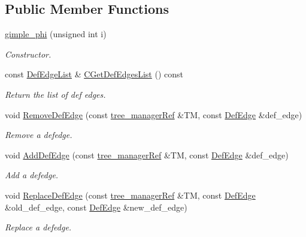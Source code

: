 \subsection*{Public Member Functions}
\begin{DoxyCompactItemize}
\item 
\hyperlink{structgimple__phi_a7c183fbc4a262b0f3496fea6c020b6fd}{gimple\+\_\+phi} (unsigned int i)
\begin{DoxyCompactList}\small\item\em Constructor. \end{DoxyCompactList}\item 
const \hyperlink{structgimple__phi_abaf4e51c9be92bf7efbf5aaaab82f386}{Def\+Edge\+List} \& \hyperlink{structgimple__phi_a6c23001f31be0018466078548400aaa3}{C\+Get\+Def\+Edges\+List} () const
\begin{DoxyCompactList}\small\item\em Return the list of def edges. \end{DoxyCompactList}\item 
void \hyperlink{structgimple__phi_a6e189a7f3d971c003d530009d44e779c}{Remove\+Def\+Edge} (const \hyperlink{tree__manager_8hpp_a96ff150c071ce11a9a7a1e40590f205e}{tree\+\_\+manager\+Ref} \&TM, const \hyperlink{structgimple__phi_a019724c668ca2269a031adfa47fbec7b}{Def\+Edge} \&def\+\_\+edge)
\begin{DoxyCompactList}\small\item\em Remove a defedge. \end{DoxyCompactList}\item 
void \hyperlink{structgimple__phi_ab509d81560e1608d4778746a5dd79a42}{Add\+Def\+Edge} (const \hyperlink{tree__manager_8hpp_a96ff150c071ce11a9a7a1e40590f205e}{tree\+\_\+manager\+Ref} \&TM, const \hyperlink{structgimple__phi_a019724c668ca2269a031adfa47fbec7b}{Def\+Edge} \&def\+\_\+edge)
\begin{DoxyCompactList}\small\item\em Add a defedge. \end{DoxyCompactList}\item 
void \hyperlink{structgimple__phi_aa7da8f80696e2bcf78254d3ad0d4f1ac}{Replace\+Def\+Edge} (const \hyperlink{tree__manager_8hpp_a96ff150c071ce11a9a7a1e40590f205e}{tree\+\_\+manager\+Ref} \&TM, const \hyperlink{structgimple__phi_a019724c668ca2269a031adfa47fbec7b}{Def\+Edge} \&old\+\_\+def\+\_\+edge, const \hyperlink{structgimple__phi_a019724c668ca2269a031adfa47fbec7b}{Def\+Edge} \&new\+\_\+def\+\_\+edge)
\begin{DoxyCompactList}\small\item\em Replace a defedge. \end{DoxyCompactList}\item 

\end{DoxyCompactItemize}
